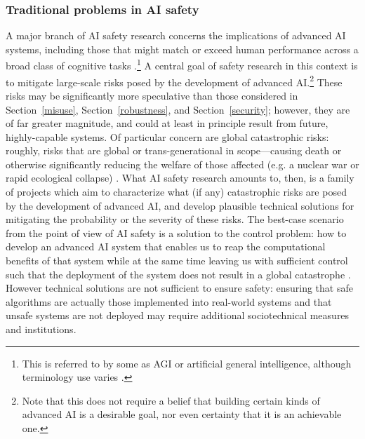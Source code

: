 \subsubsection{Traditional problems in AI safety}

A major branch of AI safety research concerns the implications of advanced AI systems, including those that might match or exceed human performance across a broad class of cognitive tasks \citep{everitt2018agi}.\footnote{This is referred to by some as AGI or artificial general intelligence, although terminology use varies \citep[e.g. see][]{karnofsky2016potential}.} A central goal of safety research in this context is to mitigate large-scale risks posed by the development of advanced AI.\footnote{Note that this does not require a belief that building certain kinds of advanced AI is a desirable goal, nor even certainty that it is an achievable one.} These risks may be significantly more speculative than those considered in Section~\ref{misuse}, Section~\ref{robustness}, and Section~\ref{security}; however, they are of far greater magnitude, and could at least in principle result from future, highly-capable systems. Of particular concern are global catastrophic risks: roughly, risks that are global or trans-generational in scope—causing death or otherwise significantly reducing the welfare of those affected (e.g. a nuclear war or rapid ecological collapse) \citep{bostrom2011global}. What AI safety research amounts to, then, is a family of projects which aim to characterize what (if any) catastrophic risks are posed by the development of advanced AI, and develop plausible technical solutions for mitigating the probability or the severity of these risks. The best-case scenario from the point of view of AI safety is a solution to the control problem: how to develop an advanced AI system that enables us to reap the computational benefits of that system while at the same time leaving us with sufficient control such that the deployment of the system does not result in a global catastrophe \citep{bostrom2011global}. However technical solutions are not sufficient to ensure safety: ensuring that safe algorithms are actually those implemented into real-world systems and that unsafe systems are not deployed may require additional sociotechnical measures and institutions. 

